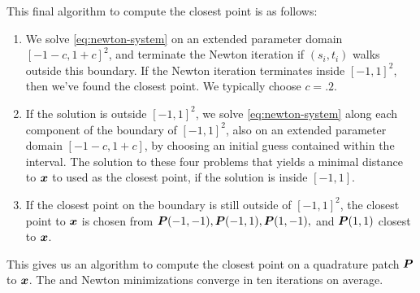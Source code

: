 This final algorithm to compute the closest point is as follows:
\begin{enumerate}
  \item We solve \cref{eq:newton-system} on an extended parameter domain $[-1-c, 1+c]^2$, and terminate the Newton iteration if $(s_i,t_i)$ walks outside this boundary. 
    If the Newton iteration terminates inside $[-1,1]^2$, then we've found the closest point.
    We typically choose $c = .2$.
  \item  If the solution is outside $[-1,1]^2$, we solve \cref{eq:newton-system} along each component of the boundary of $[-1,1]^2$, also on an extended parameter domain $[-1-c,1+c]$,
    by choosing an initial guess contained within the interval.
    The solution to these four problems that yields a minimal distance to ${\bm{x}}$ to used as the closest point, if the solution is inside $[-1,1]$.
  \item If the closest point on the boundary is still outside of $[-1,1]^2$, the
      closest point to ${\bm{x}}$ is chosen from ${\bm{P}}(-1,-1), {\bm{P}}(-1,1), {\bm{P}}(1,-1),$ and ${\bm{P}}(1,1)$ closest to ${\bm{x}}$.
\end{enumerate}
This gives us an algorithm to compute the closest point on a quadrature patch ${\bm{P}}$ to ${\bm{x}}$.
The \oned and \twod Newton minimizations converge in ten iterations on average.


